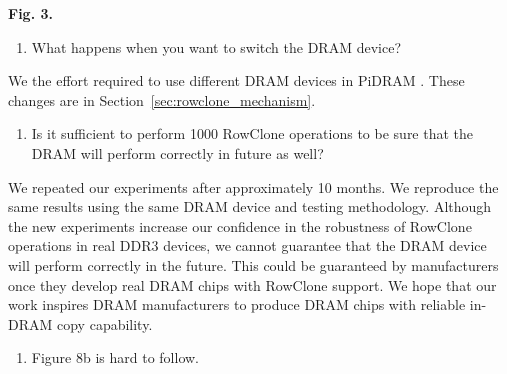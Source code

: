 \textbf{Fig. 3. }
\yyboxend 

\newpage
\bigbreak
\begin{tcolorbox}
    \begin{enumerate}[label=R4/\arabic*]
        \addtocounter{enumi}{8}
        \item \label{q:r4q9} What happens when you want to switch the DRAM device?
    \end{enumerate}
\end{tcolorbox} 

We  the effort required to use different DRAM devices in PiDRAM . These changes are in Section~\ref{sec:rowclone_mechanism}.

\vspace{5pt}
\yyboxbegin
{}
\yyboxend 

\bigbreak
\begin{tcolorbox}
    \begin{enumerate}[label=R4/\arabic*]
        \addtocounter{enumi}{9}
        \item \label{q:r4q10} Is it sufficient to perform 1000 RowClone operations to be sure that the DRAM will perform correctly in future as well?
    \end{enumerate}
\end{tcolorbox} 

We repeated our experiments after approximately 10 months. We reproduce the same results using the same DRAM device and testing methodology. Although the new experiments increase our confidence in the robustness of RowClone operations in real DDR3 devices, we cannot  guarantee that the DRAM device will perform correctly in the future. This could be guaranteed by manufacturers once they develop real DRAM chips with RowClone support. We hope that our work inspires DRAM manufacturers to produce DRAM chips with reliable in-DRAM copy capability. 


\bigbreak
\begin{tcolorbox}
    \begin{enumerate}[label=R4/\arabic*]
        \addtocounter{enumi}{10}
        \item \label{q:r4q11} Figure 8b is hard to follow.
    \end{enumerate}
\end{tcolorbox} 

